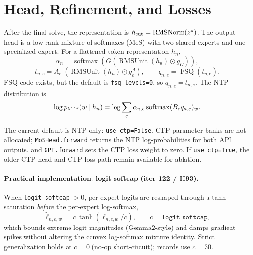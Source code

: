 \documentclass[11pt]{article}
\newcommand{\softmax}{\operatorname{softmax}}
\newcommand{\RMSUnit}{\operatorname{RMSUnit}}
\newcommand{\RMSNorm}{\operatorname{RMSNorm}}
\begin{document}
\section{Head, Refinement, and Losses}
\label{sec:head}

After the final solve, the representation is
$h_{\rm out}=\RMSNorm(z^\star)$.  The output head is a low-rank
mixture-of-softmaxes (MoS) with two shared experts and one specialized expert.
For a flattened token representation $h_n$,
\[
  \alpha_n=\softmax(G(\RMSUnit(h_n)\odot g_G)),
\]
\[
  t_{n,e}=A_e^\top(\RMSUnit(h_n)\odot g^A_e),
  \qquad
  q_{n,e}=\operatorname{FSQ}(t_{n,e}).
\]
FSQ code exists, but the default is \texttt{fsq\_levels=0}, so
$q_{n,e}=t_{n,e}$.  The NTP distribution is
\[
  \log p_{\rm NTP}(w\mid h_n)
    = \log\sum_e \alpha_{n,e}
      \operatorname{softmax}(B_e q_{n,e})_w .
\]

The current default is NTP-only: \texttt{use\_ctp=False}.  CTP parameter banks
are not allocated; \texttt{MoSHead.forward} returns the NTP log-probabilities
for both API outputs, and \texttt{GPT.forward} sets the CTP loss weight to zero.
If \texttt{use\_ctp=True}, the older CTP head and CTP loss path remain
available for ablation.

\paragraph{Practical implementation: logit softcap (iter 122 / H93).}  When
\texttt{logit\_softcap} $>0$, per-expert logits are reshaped through a tanh
saturation \emph{before} the per-expert log-softmax,
\[
  \tilde\ell_{n,e,w}
    = c\,\tanh(\ell_{n,e,w}/c),\qquad c=\texttt{logit\_softcap},
\]
which bounds extreme logit magnitudes (Gemma2-style) and damps gradient
spikes without altering the convex log-softmax mixture identity.  Strict
generalization holds at $c=0$ (no-op short-circuit); records use $c=30$.
\end{document}
